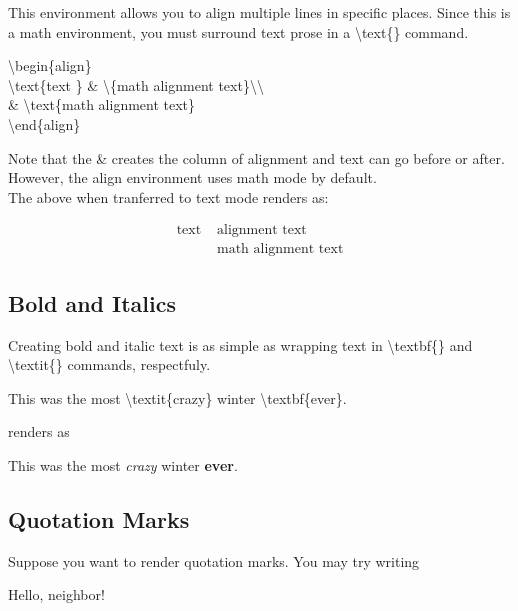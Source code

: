 \documentclass[11pt,onecolumn]{article}
\theoremstyle{definition}
\begin{document}
\begin{itemize}
    This environment allows you to align multiple lines in specific places. 
    Since this is a math environment, you must surround text prose in a \textbackslash text\{\} command.
    
    \begin{tcolorbox}
        \textbackslash begin\{align\}\\
        \hspace*{10mm} \textbackslash text\{text \} \& \textbackslash \{math alignment text\}\textbackslash \textbackslash\\
        \hspace*{10mm} \& \textbackslash text\{math alignment text\} \\
        \textbackslash end\{align\}
    \end{tcolorbox}
    Note that the \& creates the column of alignment and text can go before or after. However, the align environment uses math mode by default. \\
    The above when tranferred to text mode renders as:
    
    \begin{align*}
    \text{text } & \text{alignment text}\\
    & \text{math alignment text}
    \end{align*}
\end{itemize}

\subsection{Bold and Italics}

Creating bold and italic text is as simple as wrapping text in \textbackslash textbf\{\} and \textbackslash textit\{\} commands, respectfuly.

\begin{tcolorbox}
This was the most \textbackslash textit\{crazy\} winter \textbackslash textbf\{ever\}.
\end{tcolorbox}

renders as

This was the most \textit{crazy} winter \textbf{ever}.

\subsection{Quotation Marks}

Suppose you want to render quotation marks. You may try writing

\begin{tcolorbox}
\textquotesingle\textquotesingle Hello, neighbor!\textquotesingle\textquotesingle
\end{tcolorbox}
\end{document}
